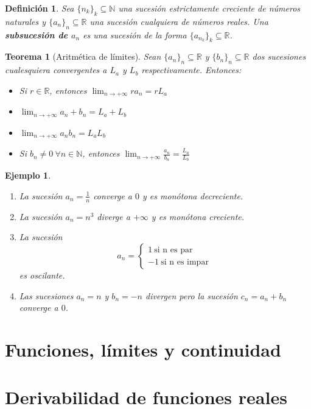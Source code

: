 \documentclass{article}
\newtheorem{theorem}{Teorema}
\newtheorem{define}{Definición}
\newtheorem{ejem}{Ejemplo}
\begin{document}
\begin{define}
	Sea $\{ n_k\}_k \subseteq \mathbb{N}$ una sucesión estrictamente creciente de números naturales y $\{ a_n\}_n \subseteq \mathbb{R}$ una sucesión cualquiera de números reales.
	Una \textbf{subsucesión de $a_n$} es una sucesión de la forma $\{ a_{n_k}\}_k \subseteq \mathbb{R}$.
\end{define}

\begin{theorem}[Aritmética de límites]
	Sean $\{ a_n\}_n \subseteq \mathbb{R}$ y $\{ b_n\}_n \subseteq \mathbb{R}$ dos sucesiones cualesquiera convergentes a $L_a$ y $L_b$ respectivamente. Entonces:
	\begin{itemize}
		\item
		Si $r \in \mathbb{R}$, entonces $\lim_{n\rightarrow +\infty} ra_n = rL_a$
		\item
		$\lim_{n\rightarrow +\infty} a_n + b_n = L_a + L_b$
		\item
		$\lim_{n\rightarrow +\infty} a_nb_n = L_aL_b$
		\item
		Si $b_n \neq 0\ \forall n \in \mathbb{N}$, entonces $\lim_{n\rightarrow +\infty} \frac{a_n}{b_n} = \frac{L_a}{L_b}$
	\end{itemize}
\end{theorem}


\begin{ejem}
\begin{enumerate}
\item
La sucesión $a_n = \frac{1}{n}$ converge a $0$ y es monótona decreciente.
\item
La sucesión $a_n = n^3$ diverge a $+\infty$ y es monótona creciente.
\item
La sucesión 
\begin{equation}
a_n = \left\lbrace
\begin{array}{l}
1\ \text{si n es par}\\ 
-1\ \text{si n es impar}\
\end{array}
\right.
\end{equation}
es oscilante.
\item
Las sucesiones $a_n = n$ y $b_n = -n$ divergen pero la sucesión $c_n = a_n + b_n$ converge a $0$.
\end{enumerate}
\end{ejem}









\section{Funciones, límites y continuidad}

\section{Derivabilidad de funciones reales}
\end{document}
